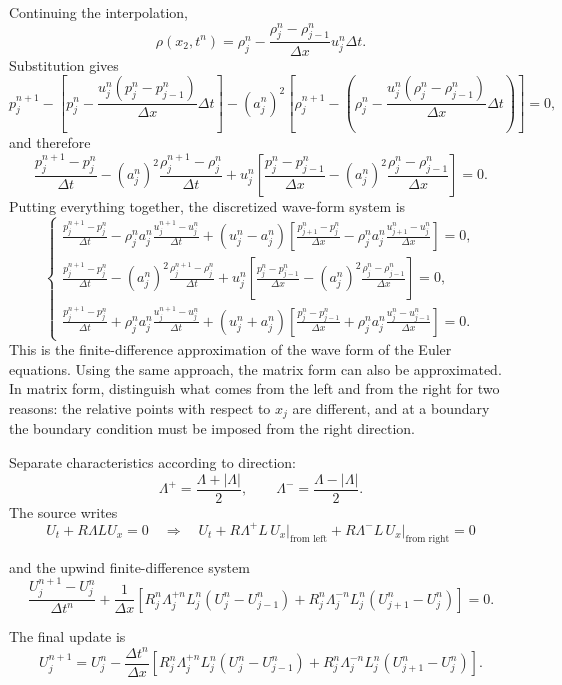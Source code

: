 \documentclass[11pt]{article}
\begin{document}
Continuing the interpolation,
\[
\rho(x_2,t^n)=\rho_j^n
-\frac{\rho_j^n-\rho_{j-1}^n}{\Delta x}u_j^n\Delta t.
\]
Substitution gives
\[
p_j^{n+1}-\left[p_j^n-
\frac{u_j^n(p_j^n-p_{j-1}^n)}{\Delta x}\Delta t\right]
-(a_j^n)^2\left[\rho_j^{n+1}-\left(\rho_j^n-
\frac{u_j^n(\rho_j^n-\rho_{j-1}^n)}{\Delta x}\Delta t\right)\right]=0,
\]
and therefore
\[
\frac{p_j^{n+1}-p_j^n}{\Delta t}
-(a_j^n)^2\frac{\rho_j^{n+1}-\rho_j^n}{\Delta t}
+u_j^n\left[
\frac{p_j^n-p_{j-1}^n}{\Delta x}
-(a_j^n)^2\frac{\rho_j^n-\rho_{j-1}^n}{\Delta x}
\right]=0.
\]
Putting everything together, the discretized wave-form system is
\[
\begin{cases}
\displaystyle
\frac{p_j^{n+1}-p_j^n}{\Delta t}
-\rho_j^n a_j^n\frac{u_j^{n+1}-u_j^n}{\Delta t}
+(u_j^n-a_j^n)\left[
\frac{p_{j+1}^n-p_j^n}{\Delta x}
-\rho_j^n a_j^n\frac{u_{j+1}^n-u_j^n}{\Delta x}
\right]=0,\\[10pt]
\displaystyle
\frac{p_j^{n+1}-p_j^n}{\Delta t}
-(a_j^n)^2\frac{\rho_j^{n+1}-\rho_j^n}{\Delta t}
+u_j^n\left[
\frac{p_j^n-p_{j-1}^n}{\Delta x}
-(a_j^n)^2\frac{\rho_j^n-\rho_{j-1}^n}{\Delta x}
\right]=0,\\[10pt]
\displaystyle
\frac{p_j^{n+1}-p_j^n}{\Delta t}
+\rho_j^n a_j^n\frac{u_j^{n+1}-u_j^n}{\Delta t}
+(u_j^n+a_j^n)\left[
\frac{p_j^n-p_{j-1}^n}{\Delta x}
+\rho_j^n a_j^n\frac{u_j^n-u_{j-1}^n}{\Delta x}
\right]=0.
\end{cases}
\]
This is the finite-difference approximation of the wave form of the Euler
equations. Using the same approach, the matrix form can also be approximated.
In matrix form, distinguish what comes from the left and from the right for
two reasons: the relative points with respect to \(x_j\) are different, and
at a boundary the boundary condition must be imposed from the right
direction.

Separate characteristics according to direction:
\[
\Lambda^+=\frac{\Lambda+|\Lambda|}{2},
\qquad
\Lambda^-=\frac{\Lambda-|\Lambda|}{2}.
\]
The source writes
\[
U_t+R\Lambda L U_x=0
\quad\Longrightarrow\quad
U_t+R\Lambda^+L\,U_x\big|_{\text{from left}}
+R\Lambda^-L\,U_x\big|_{\text{from right}}=0
\]

and the upwind finite-difference system
\[
\frac{U_j^{n+1}-U_j^n}{\Delta t^n}
+\frac{1}{\Delta x}\left[
R_j^n\Lambda_j^{+n}L_j^n(U_j^n-U_{j-1}^n)
+R_j^n\Lambda_j^{-n}L_j^n(U_{j+1}^n-U_j^n)
\right]=0.
\]

The final update is
\[
\boxed{
U_j^{n+1}=U_j^n-\frac{\Delta t^n}{\Delta x}\left[
R_j^n\Lambda_j^{+n}L_j^n(U_j^n-U_{j-1}^n)
+R_j^n\Lambda_j^{-n}L_j^n(U_{j+1}^n-U_j^n)
\right].}
\]
\end{document}
